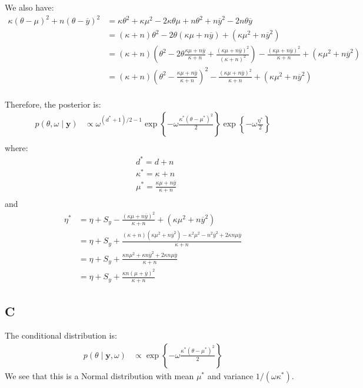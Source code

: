 \documentclass{article}
\begin{document}
We also have:
\begin{align*}
\kappa(\theta-\mu)^2 + n (\theta - \overline{y})^2 &= \kappa\theta^2 + \kappa\mu^2 - 2\kappa\theta\mu + n\theta^2 + n\overline{y}^2 - 2n\theta\overline{y}\\
&= (\kappa + n)\theta^2 - 2\theta(\kappa\mu + n\overline{y}) + (\kappa\mu^2 + n\overline{y}^2)\\
&=(\kappa+n)\left( \theta^2 - 2 \theta \frac{\kappa\mu + n\overline{y}}{\kappa + n} + \frac{(\kappa\mu + n\overline{y})^2}{(\kappa + n)^2} \right) - \frac{(\kappa\mu + n\overline{y})^2}{\kappa + n} + (\kappa\mu^2 + n\overline{y}^2)\\
&= (\kappa+n)\left( \theta^2 -\frac{\kappa\mu + n\overline{y}}{\kappa + n}\right)^2 - \frac{(\kappa\mu + n\overline{y})^2}{\kappa + n} + (\kappa\mu^2 + n\overline{y}^2)\\
\end{align*}


Therefore, the posterior is:
\begin{align*}
p(\theta, \omega \mid \mathbf{y}) &\propto \omega^{(d^*+1)/2 - 1} \exp\left\lbrace - \omega \frac{\kappa^*(\theta-\mu^*)^2}{2} \right\rbrace \exp\left\lbrace -\omega \frac{\eta^*}{2}\right\rbrace\\
\end{align*}
where:
\begin{align*}
&d^* = d + n\\
&\kappa^* = \kappa + n\\
&\mu^* = \frac{\kappa\mu + n\overline{y}}{\kappa + n}\\
\end{align*}
and
\begin{align*}
\eta^* &= \eta + S_y - \frac{(\kappa\mu + n\overline{y})^2}{\kappa + n} + (\kappa\mu^2 + n\overline{y}^2)\\
&= \eta + S_y + \frac{(\kappa+n)(\kappa\mu^2 + n\overline{y}^2) - \kappa^2\mu^2 - n^2\overline{y}^2 + 2\kappa n\mu \overline{y} }{\kappa + n}\\
&= \eta + S_y + \frac{\kappa n\mu^2 + \kappa n\overline{y}^2 + 2\kappa n\mu \overline{y} }{\kappa + n}\\
&= \eta + S_y + \frac{\kappa n (\mu + \overline{y})^2}{\kappa + n}
\end{align*}

\subsection*{C}
The conditional distribution is:
\begin{align*}
p(\theta \mid \mathbf{y}, \omega) &\propto \exp\left\lbrace - \omega \frac{\kappa^*(\theta-\mu^*)^2}{2} \right\rbrace
\end{align*}
We see that this is a Normal distribution with mean \(\mu^*\) and variance \(1/(\omega\kappa^*)\).
\end{document}
